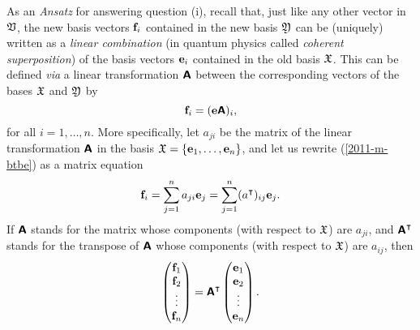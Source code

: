 As an {\it Ansatz} for answering question (i), recall that, just like any other vector in ${\frak V}$,
the new basis vectors ${\bf f}_i$ contained in the new basis ${\frak Y}$
can be (uniquely) written as a {\em linear combination}
(in quantum physics called {\em coherent superposition})
of the basis vectors
${\bf e}_i$ contained in the old  basis ${\frak X}$.
This can be defined {\it via}
a linear transformation $\textsf{\textbf{A}}$ between the corresponding vectors of the bases
 ${\frak X}$ and
${\frak Y}$ by
\begin{equation}
{\bf f}_i= ({\bf e}\textsf{\textbf{A}})_i
,
\label{2011-m-btbe}
\end{equation}
for all $i=1, \ldots , n$.
%
More specifically, let ${a}_{ji}$ be the matrix of the linear transformation $\textsf{\textbf{A}}$
in the basis
${\frak X}
=
\{
{\bf e}_1,
\ldots ,
{\bf e}_n
\}$,
and let us rewrite (\ref{2011-m-btbe}) as a matrix equation
\begin{equation}
{\bf f}_i= \sum_{j=1}^n a_{ji} {\bf e}_j   = \sum_{j=1}^n (a^\intercal )_{ij} {\bf e}_j
.
\label{2011-m-btbe-r}
\end{equation}
If $\textsf{\textbf{A}}$ stands for the matrix whose components (with respect to ${\frak X}$) are  $a_{ji}$,
and $\textsf{\textbf{A}}^\intercal $
stands for the transpose of $\textsf{\textbf{A}}$
whose components (with respect to ${\frak X}$) are  $a_{ij}$,
then
\begin{equation}
\begin{pmatrix}
{\bf f}_1\\
{\bf f}_2\\
\vdots\\
{\bf f}_n
\end{pmatrix}
= \textsf{\textbf{A}}^\intercal
\begin{pmatrix}
{\bf e}_1\\
{\bf e}_2\\
\vdots\\
{\bf e}_n
\end{pmatrix}
.
\label{2011-m-btbe-r1}
\end{equation}


